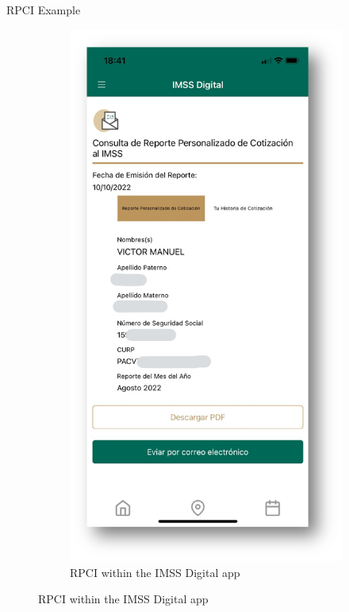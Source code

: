 \documentclass[notes,11pt, aspectratio=169]{beamer}
\begin{document}
\begin{frame}{RPCI Example}
    \begin{figure}[H]
    \label{rpci_example}
    \begin{center}
    
    \begin{subfigure}{0.49\textwidth}
    \caption{RPCI within the IMSS Digital app}
    \includegraphics[width=\textwidth]{04_Figures/rpci_app/rpci_2.png}

\end{subfigure}
\end{center}
\end{figure}
\end{frame}
\end{document}
